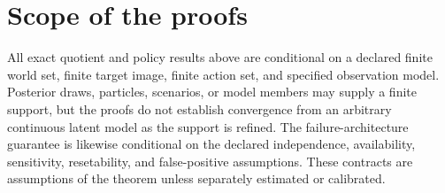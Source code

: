\documentclass[11pt]{article}
\begin{document}
\section{Scope of the proofs}
All exact quotient and policy results above are conditional on a declared finite world set, finite target image, finite action set, and specified observation model. Posterior draws, particles, scenarios, or model members may supply a finite support, but the proofs do not establish convergence from an arbitrary continuous latent model as the support is refined. The failure-architecture guarantee is likewise conditional on the declared independence, availability, sensitivity, resetability, and false-positive assumptions. These contracts are assumptions of the theorem unless separately estimated or calibrated.
\end{document}
